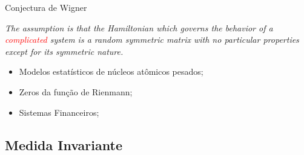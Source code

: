 \begin{frame}
	\begin{history}{Conjectura de Wigner}
		\parbox{\linewidth}{\textit{The assumption is that
			the Hamiltonian which governs the behavior of
			a \textcolor{red}{complicated} system is a random symmetric
			matrix with no particular properties except for
			its symmetric nature.}}
	\end{history}

	\vspace{1cm}

	\pause
	\begin{itemize}
		\item Modelos estatísticos de núcleos atômicos pesados;
		\item Zeros da função de Rienmann;
		\item Sistemas Financeiros;
	\end{itemize}
	
	
\end{frame}


\subsection{Medida Invariante}

